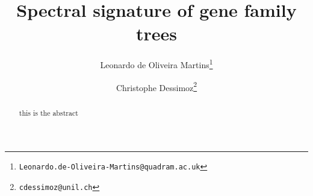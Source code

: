 \documentclass[pdftex,12pt,a4paper,openany,fleqn]{article}
\title{Spectral signature of gene family trees}
\author[1]{Leonardo de Oliveira Martins\thanks{{\tt Leonardo.de-Oliveira-Martins@quadram.ac.uk}}}
\author[2,3]{Christophe Dessimoz\thanks{{\tt cdessimoz@unil.ch}}}
\affil[1]{Quadram Institute Biosciences, Norwich, NR4 7UQ, UK}
\affil[2]{UNIL}
\affil[3]{UCL}
\date{\vspace{-5ex}}
\begin{document}
\maketitle

\begin{abstract}
this is the abstract
\end{abstract}






\begin{spacing}{0.8}  \end{spacing}
\end{document}
